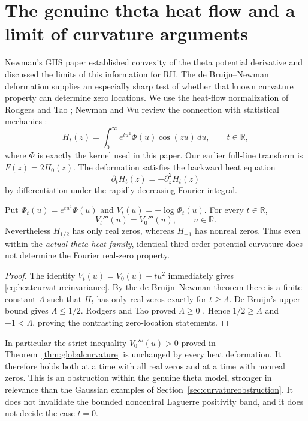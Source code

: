 \section{The genuine theta heat flow and a limit of curvature arguments}
\label{sec:thetaheat}
Newman's GHS paper \cite{NewmanGHS} established
convexity of the theta potential derivative and
discussed the limits of this information for RH.
The de Bruijn--Newman deformation supplies an
especially sharp test of whether that known
curvature property can determine zero locations.
We use the heat-flow normalization of
Rodgers and Tao \cite{RodgersTao}; Newman and
Wu review the connection with statistical
mechanics \cite{NewmanWu}:
\begin{equation}
H_t(z)=\int_0^\infty e^{tu^2}\Phi(u)\cos(zu)\,du,
\qquad t\in\mathbb R,
\label{eq:heatH}
\end{equation}
where $\Phi$ is exactly the kernel used in this paper.
Our earlier full-line transform is $F(z)=2H_0(z)$.
The deformation satisfies the backward heat equation
\begin{equation}
\partial_tH_t(z)=-\partial_z^2H_t(z)
\label{eq:heatbackwards}
\end{equation}
by differentiation under the rapidly decreasing
Fourier integral.

\begin{theorem}
\label{thm:heatcurvatureobstruction}
Put $\Phi_t(u)=e^{tu^2}\Phi(u)$ and
$V_t(u)=-\log\Phi_t(u)$. For every $t\in\mathbb R$,
\begin{equation}
V_t'''(u)=V_0'''(u),\qquad u\in\mathbb R.
\label{eq:heatcurvatureinvariance}
\end{equation}
Nevertheless $H_{1/2}$ has only real zeros,
whereas $H_{-1}$ has nonreal zeros.
Thus even within the \emph{actual theta heat family},
identical third-order potential curvature
does not determine the Fourier real-zero property.
\end{theorem}
\begin{proof}
The identity $V_t(u)=V_0(u)-tu^2$
immediately gives \eqref{eq:heatcurvatureinvariance}.
By the de Bruijn--Newman theorem there is a finite
constant $\Lambda$ such that $H_t$ has only real
zeros exactly for $t\ge\Lambda$.
De Bruijn's upper bound gives $\Lambda\le1/2$.
Rodgers and Tao proved $\Lambda\ge0$
\cite{RodgersTao}. Hence $1/2\ge\Lambda$
and $-1<\Lambda$, proving the contrasting
zero-location statements.
\end{proof}

In particular the strict inequality
$V_0'''(u)>0$ proved in
Theorem~\ref{thm:globalcurvature} is unchanged
by every heat deformation. It therefore holds
both at a time with all real zeros and
at a time with nonreal zeros.
This is an obstruction within the genuine theta
model, stronger in relevance than the
Gaussian examples of Section~\ref{sec:curvatureobstruction}.
It does not invalidate the bounded noncentral
Laguerre positivity band, and it does not decide
the case $t=0$.

